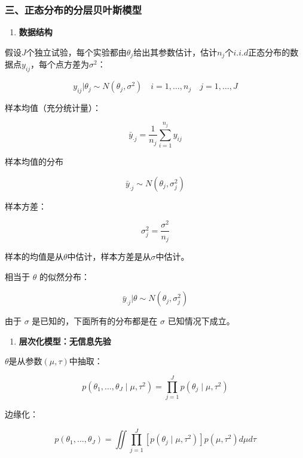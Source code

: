 \hypertarget{ux4e09ux6b63ux6001ux5206ux5e03ux7684ux5206ux5c42ux8d1dux53f6ux65afux6a21ux578b}{%
\subsubsection{三、正态分布的分层贝叶斯模型}\label{ux4e09ux6b63ux6001ux5206ux5e03ux7684ux5206ux5c42ux8d1dux53f6ux65afux6a21ux578b}}

\begin{enumerate}
\def\labelenumi{\arabic{enumi}.}
\item
  \textbf{数据结构}
\end{enumerate}

假设\(J\)个独立试验，每个实验都由\(\theta_j\)给出其参数估计，估计\(n_j\)个\(i.i.d\)正态分布的数据点\(y_{ij}\)，每个点方差为\(\sigma^2\)：

\[y_{i j} | \theta_{j} \sim N\left(\theta_{j}, \sigma^{2}\right) \quad i=1, \ldots, n_{j} \quad j=1, \ldots, J\]

样本均值（充分统计量）：

\[\bar{y}_{\cdot j}=\frac{1}{n_j}\sum_{i=1}^{n_j}y_{ij}\]

样本均值的分布

\[\bar y_{\cdot j} \sim N(\theta_j,\sigma^2_j)\]

样本方差：

\[\sigma^2_j=\frac{\sigma^2}{n_j}\]

样本的均值是从\(\theta\)中估计，样本方差是从\(\sigma\)中估计。

相当于 \(\theta\) 的似然分布：

\[\bar y_{\cdot j}|\theta \sim N(\theta_j,\sigma^2_j)\]

由于 \(\sigma\) 是已知的，下面所有的分布都是在 \(\sigma\)
已知情况下成立。

\begin{enumerate}
\def\labelenumi{\arabic{enumi}.}
\item
  \textbf{层次化模型：无信息先验}
\end{enumerate}

\(\theta\)是从参数\((\mu,\tau)\)中抽取：

\[p\left(\theta_{1}, \ldots, \theta_{J} \mid \mu, \tau^{2}\right)=\prod_{j=1}^{J} p\left(\theta_{j} \mid \mu, \tau^{2}\right)\]

边缘化：

\[p\left(\theta_{1}, \ldots, \theta_{J}\right)=
\iint \prod_{j=1}^{J}
\left[p\left(\theta_{j} \mid \mu, \tau^{2}\right)\right] 
p\left(\mu, \tau^{2}\right)
d \mu d \tau\]

